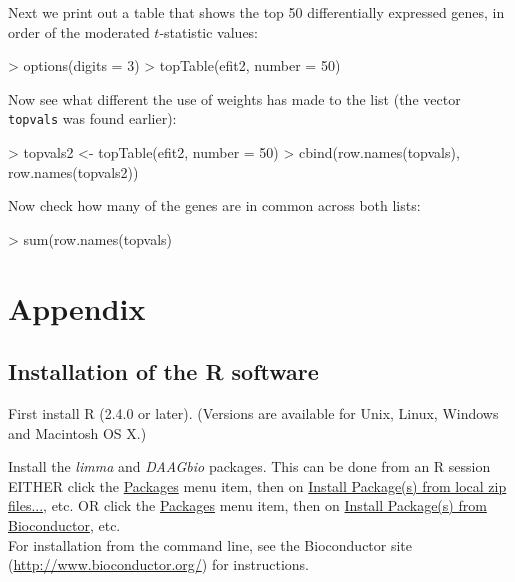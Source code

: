 \documentclass[a4paper,9pt]{article}
\begin{document}
Next we print out a table that shows the top 50 differentially
expressed genes, in order of the moderated $t$-statistic values:
\begin{Schunk}
\begin{Sinput}
> options(digits = 3)
> topTable(efit2, number = 50)
\end{Sinput}
\end{Schunk}

Now see what different the use of weights has made to the list
(the vector \texttt{topvals} was found earlier):
\begin{Schunk}
\begin{Sinput}
> topvals2 <- topTable(efit2, number = 50)
> cbind(row.names(topvals), row.names(topvals2))
\end{Sinput}
\end{Schunk}
Now check how many of the genes are in common across both lists:
\begin{Schunk}
\begin{Sinput}
> sum(row.names(topvals) %in% row.names(topvals2))
\end{Sinput}
\end{Schunk}
\section*{Appendix}

\subsection*{Installation of the R software}
First install R (2.4.0 or later).  (Versions are available for Unix,
Linux, Windows and Macintosh OS X.)

Install the \textit{limma} and \textit{DAAGbio} packages.
This can be done from an R session\\
EITHER click the \underline{Packages} menu item, then on 
\underline{Install Package(s) from local zip files...}, etc.\newline
OR click the \underline{Packages} menu item, then on 
\underline{Install Package(s) from Bioconductor}, etc.\\

For installation from the command line, see the Bioconductor site
(\url{http://www.bioconductor.org/}) for instructions.
\end{document}
